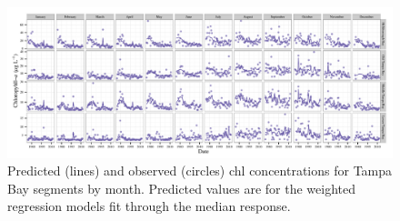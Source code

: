 \documentclass{svjour3}\usepackage[]{graphicx}\usepackage[]{color}
\newcommand{\beginsupplement}{%
        \setcounter{table}{0}
        \renewcommand{\thetable}{S\arabic{table}}%
        \setcounter{figure}{0}
        \renewcommand{\thefigure}{S\arabic{figure}}%
     }
\begin{document}
\beginsupplement
\begin{landscape}
\centering\vspace*{\fill}
\begin{figure}[!ht]


{\centering \includegraphics[width=9in]{figssup} 

}

\caption[Predicted (lines) and observed (circles) \ac{chl} concentrations for Tampa Bay segments by month]{Predicted (lines) and observed (circles) \ac{chl} concentrations for Tampa Bay segments by month.  Predicted values are for the weighted regression models fit through the median response.\label{fig:sup}}
\end{figure}


\vfill
\end{landscape}
\end{document}
